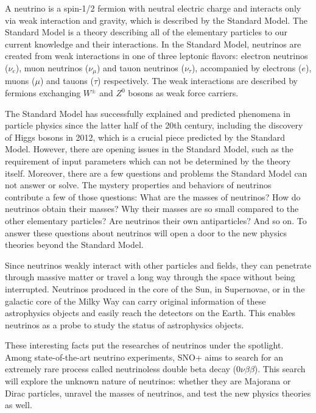 
A neutrino is a spin-1/2 fermion with neutral electric charge and interacts only via weak interaction and gravity, which is described by the Standard Model. The Standard Model is a theory describing all of the elementary particles to our current knowledge and their interactions.
In the Standard Model, neutrinos are created from weak interactions in one of three leptonic flavors:
electron neutrinos ($\nu_e$), muon neutrinos ($\nu_\mu$) and tauon neutrinos ($\nu_\tau$), accompanied by electrons ($e$), muons ($\mu$) and tauons ($\tau$) respectively. The weak interactions are described by fermions exchanging $W^{\pm}$ and $Z^0$ bosons as weak force carriers.

The Standard Model has successfully explained and predicted phenomena in particle physics since the latter half of the 20th century, including the discovery of Higgs bosons in 2012, which is a crucial piece predicted by the Standard Model. However, there are opening issues in the Standard Model, such as the requirement of input parameters which can not be determined by the theory itself. Moreover, there are a few questions and problems the Standard Model can not answer or solve. The mystery properties and behaviors of neutrinos contribute a few of those questions: What are the masses of neutrinos? How do neutrinos obtain their masses? Why their masses are so small compared to the other elementary particles? Are neutrinos their own antiparticles? And so on. To answer these questions about neutrinos will open a door to the new physics theories beyond the Standard Model.

Since neutrinos weakly interact with other particles and fields, they can penetrate through massive matter or travel a long way through the space without being interrupted. Neutrinos produced in the core of the Sun, in Supernovae, or in the galactic core of the Milky Way can carry original information of these astrophysics objects and easily reach the detectors on the Earth. This enables neutrinos as a probe to study the status of astrophysics objects.

These interesting facts put the researches of neutrinos under the spotlight. Among state-of-the-art neutrino experiments, SNO+ aims to search for an extremely rare process called neutrinoless double beta decay ($0\nu\beta\beta$). This search will explore the unknown nature of neutrinos: whether they are Majorana or Dirac particles, unravel the masses of neutrinos, and test the new physics theories as well.

